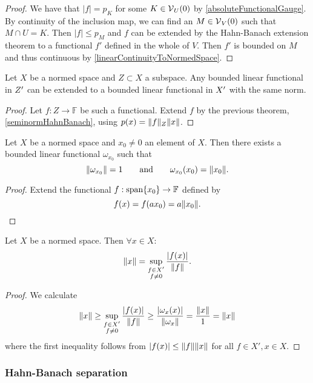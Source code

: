 \begin{proof}
We have that $|f| = p_K$ for some $K\in \operatorname{\mathcal{V}}_U(0)$ by \ref{absoluteFunctionalGauge}. By continuity of the inclusion map, we can find an $M \in \operatorname{\mathcal{V}}_V(0)$ such that $M\cap U = K$. Then $|f|\leq p_M$ and $f$ can be extended by the Hahn-Banach extension theorem to a functional $f'$ defined in the whole of $V$. Then $f'$ is bounded on $M$ and thus continuous by \ref{linearContinuityToNormedSpace}.
\end{proof}
\begin{corollary}
Let $X$ be a normed space and $Z\subset X$ a subspace. Any bounded linear functional in ${Z}^\prime$ can be extended to a bounded linear functional in ${X}^\prime$ with the same norm.
\end{corollary}
\begin{proof}
Let $f:Z\to \mathbb{F}$ be such a functional. Extend $f$ by the previous theorem, \ref{seminormHahnBanach}, using $p(x) = \lVert f\rVert_Z\lVert x\rVert$.
\end{proof}
\begin{corollary} \label{existenceBoundedFunctionalOfSameNorm}
Let $X$ be a normed space and $x_0\neq 0$ an element of $X$. Then there exists a bounded linear functional $\omega_{x_0}$ such that
\[ \lVert\omega_{x_0}\rVert = 1 \qquad \text{and} \qquad \omega_{x_0}(x_0)=\lVert x_0\rVert. \]
\end{corollary}
\begin{proof}
Extend the functional $f: \operatorname{span}\{x_0\}\to \mathbb{F}$ defined by
\[ f(x) = f(ax_0) = a\lVert x_0\rVert. \]
\end{proof}
\begin{corollary}
Let $X$ be a normed space. Then $\forall x\in X:$
\[ \lVert x\rVert = \sup_{\substack{f\in X' \\ f\neq 0}}\frac{|f(x)|}{\lVert f\rVert}. \]
\end{corollary}
\begin{proof}
We calculate
\[ \lVert x\rVert \geq \sup_{\substack{f\in X' \\ f\neq 0}}\frac{|f(x)|}{\lVert f\rVert} \geq \frac{|\omega_{x}(x)|}{\lVert\omega_{x}\rVert} = \frac{\lVert x\rVert}{1} = \lVert x\rVert \]
where the first inequality follows from $|f(x)|\leq \lVert f\rVert\lVert x\rVert$ for all $f\in X', x\in X$.
\end{proof}

\subsubsection{Hahn-Banach separation}

